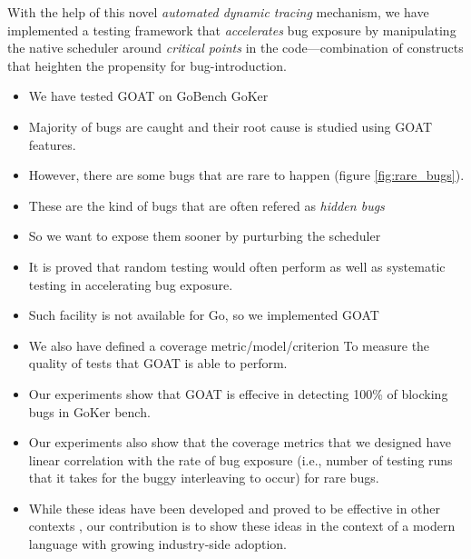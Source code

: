 With the help of this novel \textit{automated dynamic tracing} mechanism,
we have implemented a testing framework that
\textit{accelerates} bug exposure by manipulating the native scheduler around \textit{critical points} in the code---combination of constructs that heighten the propensity for bug-introduction.
%
\begin{itemize}
  \item We have tested GOAT on GoBench GoKer
  \item Majority of bugs are caught and their root cause is studied using GOAT features.
  \item However, there are some bugs that are rare to happen (figure \ref{fig:rare_bugs}).
  \item These are the kind of bugs that are often refered as \textit{hidden bugs}
  \item So we want to expose them sooner by purturbing the scheduler
  \item It is proved that random testing would often perform as well as systematic testing in accelerating bug exposure.
  \item Such facility is not available for Go, so we implemented GOAT
\end{itemize}

\begin{itemize}
  \item We also have defined a coverage metric/model/criterion To measure the quality of tests that GOAT is able to perform.
  \item Our experiments show that GOAT is effecive in detecting 100\% of blocking bugs in GoKer bench.
  \item Our experiments also show that the coverage metrics that we designed have linear correlation with the rate of bug exposure (i.e., number of testing runs that it takes for the buggy interleaving to occur) for rare bugs.
  \item While these ideas have been developed and proved to be effective in other contexts \cite{burckhardt-depthBug-asplos10,emmi-delayBounded-popl11,madanlal-preemptionBound-pldi07}, our contribution is to show these ideas in the context of a modern language with growing industry-side adoption.
\end{itemize}


